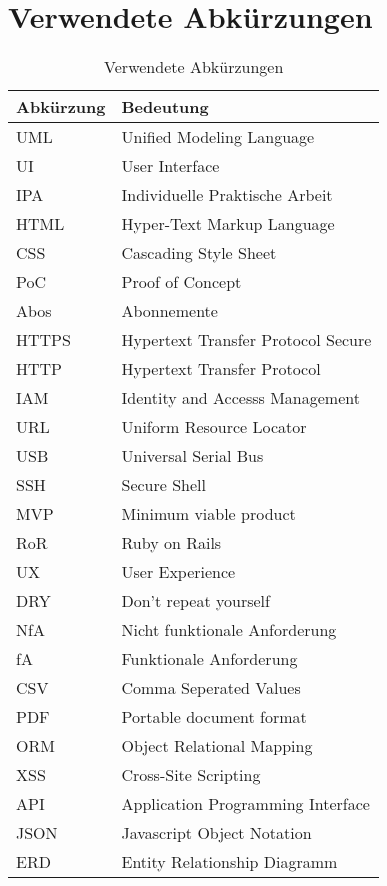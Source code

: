 \chapter{Verwendete Abkürzungen}

\begin{table}[H]
    \begin{tabular}{|L{0.3\textwidth}|L{0.6\textwidth}|}
        \hline
         \textbf{\color{white}Abkürzung} & \textbf{\color{white}Bedeutung} \\[12pt]
        \hline
        UML & Unified Modeling Language \\
        UI & User Interface \\
        IPA & Individuelle Praktische Arbeit \\
        HTML & Hyper-Text Markup Language \\
        CSS & Cascading Style Sheet \\
        PoC & Proof of Concept \\
        Abos & Abonnemente \\
        HTTPS & Hypertext Transfer Protocol Secure \\
        HTTP & Hypertext Transfer Protocol \\
        IAM & Identity and Accesss Management \\
        URL & Uniform Resource Locator \\
        USB & Universal Serial Bus \\
        SSH & Secure Shell \\
        MVP & Minimum viable product \\
        RoR & Ruby on Rails \\
        UX & User Experience \\
        DRY & Don't repeat yourself \\
        NfA & Nicht funktionale Anforderung \\
        fA & Funktionale Anforderung \\
        CSV & Comma Seperated Values \\
        PDF & Portable document format \\
        ORM & Object Relational Mapping \\
        XSS & Cross-Site Scripting \\
        API & Application Programming Interface \\
        JSON & Javascript Object Notation \\
        ERD & Entity Relationship Diagramm \\
        \hline
    \end{tabular}
    \caption{Verwendete Abkürzungen}
\end{table}

